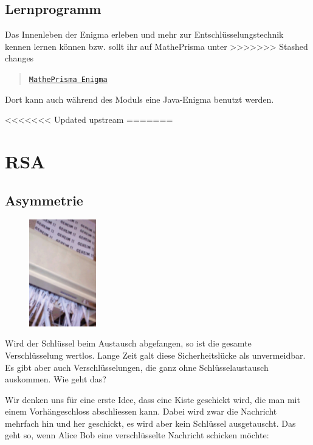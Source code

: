 \documentclass[%
<<<<<<< Updated upstream
11pt,%
twoside,%
titlepage,%
german,%
headsepline%
]{scrartcl}
\begin{document}
\subsection{Lernprogramm}
Das Innenleben der Enigma erleben und mehr zur Entschlüsselungstechnik kennen lernen k\"onnen bzw. sollt ihr auf MathePrisma unter
>>>>>>> Stashed changes
\begin{quote}
\href{http://www.matheprisma.uni-wuppertal.de/Module/Enigma/index.htm}{\texttt{MathePrisma Enigma}}
\end{quote}
Dort kann auch während des Moduls eine Java-Enigma benutzt werden.

\clearpage

<<<<<<< Updated upstream
=======
\section{RSA}
\subsection{Asymmetrie}

\begin{figure}
\vspace{-22pt}
  \begin{center}   \includegraphics[width=0.26\textwidth]{pictures/rsa}
  \end{center}
\vspace{-22pt}
\end{figure}
Wird der Schlüssel beim Austausch abgefangen, so ist die gesamte Verschlüsselung wertlos. Lange Zeit galt diese Sicherheitslücke als unvermeidbar. Es gibt aber auch Verschlüsselungen, die ganz ohne Schlüsselaustausch auskommen. Wie geht das?

Wir denken uns für eine erste Idee, dass eine Kiste geschickt wird, die man mit einem Vorhängeschloss abschliessen kann. Dabei wird zwar die Nachricht mehrfach hin und her geschickt, es wird aber kein Schlüssel ausgetauscht. Das geht so, wenn Alice Bob eine verschlüsselte Nachricht schicken möchte:
\end{document}
